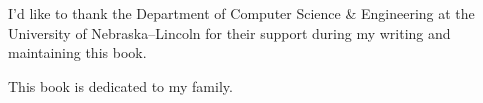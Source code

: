 
I'd like to thank the Department of Computer Science \& Engineering at the 
University of Nebraska--Lincoln for their support during my writing and maintaining
this book.  

This book is dedicated to my family.